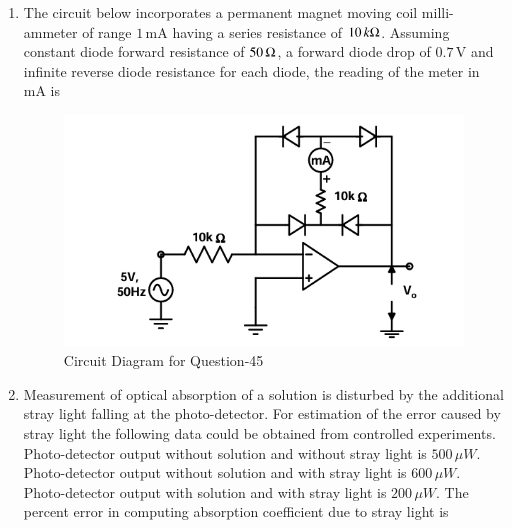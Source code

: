 \documentclass[journal,12pt,onecolumn]{IEEEtran}
\theoremstyle{remark}
\begin{document}
\begin{enumerate}
\item The circuit below incorporates a permanent magnet moving coil milli-ammeter of range $1\,\text{mA}$ having a series resistance of $10\,k\ohm$. Assuming constant diode forward resistance of $50\,\ohm$, a forward diode drop of $0.7\,\text{V}$ and infinite reverse diode resistance for each diode, the reading of the meter in mA is  
\par \hfill{}
\begin{figure}[H]
\centering
\includegraphics[width=0.5\columnwidth]{Figs/Q-45.png}
\caption{Circuit Diagram for Question-45}
\label{45}
\end{figure}
\begin{enumerate}
\end{enumerate}

\item Measurement of optical absorption of a solution is disturbed by the additional stray light falling at the photo-detector. For estimation of the error caused by stray light the following data could be obtained from controlled experiments.  
\quad Photo-detector output without solution and without stray light is $500\,\mu W$.  
\quad Photo-detector output without solution and with stray light is $600\,\mu W$.  
\quad Photo-detector output with solution and with stray light is $200\,\mu W$.  
The percent error in computing absorption coefficient due to stray light is  
\par \hfill{}
\begin{enumerate}
\end{enumerate}


\end{enumerate}
\end{document}
